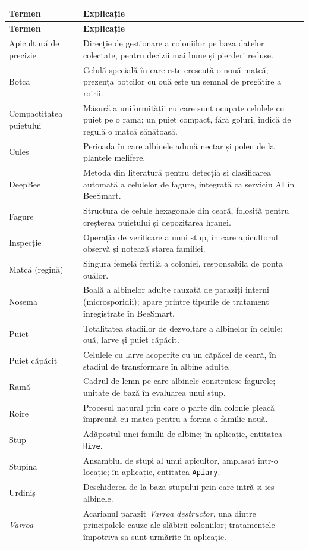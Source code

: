 \begin{longtable}{@{}p{2.6cm} p{10.6cm}@{}}
\textbf{Termen} & \textbf{Explicație} \\
\hline
\endfirsthead
\textbf{Termen} & \textbf{Explicație} \\
\hline
\endhead
Apicultură de precizie & Direcție de gestionare a coloniilor pe baza datelor colectate, pentru decizii mai bune și pierderi reduse. \\
Botcă & Celulă specială în care este crescută o nouă matcă; prezența botcilor cu ouă este un semnal de pregătire a roirii. \\
Compactitatea puietului & Măsură a uniformității cu care sunt ocupate celulele cu puiet pe o ramă; un puiet compact, fără goluri, indică de regulă o matcă sănătoasă. \\
Cules & Perioada în care albinele adună nectar și polen de la plantele melifere. \\
DeepBee & Metoda din literatură pentru detecția și clasificarea automată a celulelor de fagure, integrată ca serviciu AI în BeeSmart. \\
Fagure & Structura de celule hexagonale din ceară, folosită pentru creșterea puietului și depozitarea hranei. \\
Inspecție & Operația de verificare a unui stup, în care apicultorul observă și notează starea familiei. \\
Matcă (regină) & Singura femelă fertilă a coloniei, responsabilă de ponta ouălor. \\
Nosema & Boală a albinelor adulte cauzată de paraziți interni (microsporidii); apare printre tipurile de tratament înregistrate în BeeSmart. \\
Puiet & Totalitatea stadiilor de dezvoltare a albinelor în celule: ouă, larve și puiet căpăcit. \\
Puiet căpăcit & Celulele cu larve acoperite cu un căpăcel de ceară, în stadiul de transformare în albine adulte. \\
Ramă & Cadrul de lemn pe care albinele construiesc fagurele; unitate de bază în evaluarea unui stup. \\
Roire & Procesul natural prin care o parte din colonie pleacă împreună cu matca pentru a forma o familie nouă. \\
Stup & Adăpostul unei familii de albine; în aplicație, entitatea \texttt{Hive}. \\
Stupină & Ansamblul de stupi al unui apicultor, amplasat într-o locație; în aplicație, entitatea \texttt{Apiary}. \\
Urdiniș & Deschiderea de la baza stupului prin care intră și ies albinele. \\
\textit{Varroa} & Acarianul parazit \textit{Varroa destructor}, una dintre principalele cauze ale slăbirii coloniilor; tratamentele împotriva sa sunt urmărite în aplicație. \\
\end{longtable}
